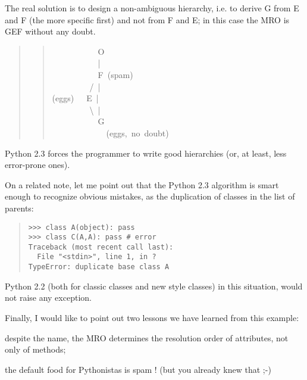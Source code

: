 \documentclass[10pt,a4paper,english]{article}
\begin{document}
The real solution is to design a non-ambiguous hierarchy, i.e. to derive
G from E and F (the more specific first) and not from F and E; in this
case the MRO is GEF without any doubt.
\begin{quote}
\begin{quote}{\ttfamily \raggedright \noindent
~~~~~~~~~~~O~\\
~~~~~~~~~~~|~\\
~~~~~~~~~~~F~(spam)~\\
~~~~~~~~~/~|~\\
(eggs)~~~E~|~\\
~~~~~~~~~{\textbackslash}~|~\\
~~~~~~~~~~~G~\\
~~~~~~~~~~~~~(eggs,~no~doubt)
}\end{quote}
\end{quote}

Python 2.3 forces the programmer to write good hierarchies (or, at
least, less error-prone ones).

On a related note, let me point out that the Python 2.3 algorithm is
smart enough to recognize obvious mistakes, as the duplication of
classes in the list of parents:
\begin{quote}
\begin{verbatim}>>> class A(object): pass
>>> class C(A,A): pass # error
Traceback (most recent call last):
  File "<stdin>", line 1, in ?
TypeError: duplicate base class A\end{verbatim}
\end{quote}

Python 2.2 (both for classic classes and new style classes) in this
situation, would not raise any exception.

Finally, I would like to point out two lessons we have learned from this
example:
\begin{list}{.}
{
\setlength{\rightmargin}{\leftmargin}
}
\item {} 
despite the name, the MRO determines the resolution order of
attributes, not only of methods;

\item {} 
the default food for Pythonistas is spam !  (but you already knew
that ;-)

\end{list}


\hspace*{\fill}\hrulefill\hspace*{\fill}
\end{document}
